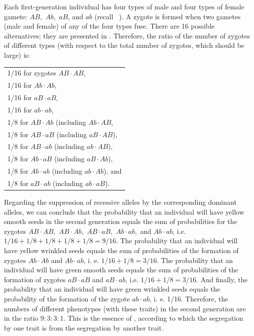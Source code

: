 Each first-generation individual has four types of male and four types
of female gamete: $AB, \,\, Ab,\,\, aB$, and $ab$ (recall ~). A zygote is formed when two gametes (male and female) of any of the four types fuse. There are 16 possible alternatives; they are presented in .  Therefore, the ratio of the number of zygotes of different types (with respect to the total number of zygotes, which should be large) is: \vspace{-15pt}
\begin{center}
\begin{tabular}{l}
1/16 for zygotes $AB \cdot AB$, \\
1/16 for $Ab \cdot Ab$, \\
1/16 for $aB \cdot aB$, \\
1/16 for $ab \cdot ab$, \\
1/8 for $AB \cdot Ab$ (including $Ab \cdot AB$, \\
1/8 for $AB \cdot aB$ (including $aB \cdot AB$),\\
1/8 for $AB \cdot ab$ (including $ab \cdot AB$), \\
1/8 for $Ab \cdot aB$ (including $aB \cdot Ab$), \\
1/8 for $Ab \cdot ab$ (including $ab \cdot Ab$), and \\
1/8 for $aB \cdot ab$ (including $ab \cdot aB$). 
\end{tabular}
\end{center}
\vspace{-15pt}

Regarding the suppression of recessive alleles by the corresponding dominant alleles,
we can conclude that the probability that an individual will have yellow
smooth seeds in the second generation equals the sum of probabilities
for the zygotes $AB\cdot AB, \,\, AB \cdot Ab,\,\, AB \cdot aB, \,\, Ab \cdot ab,$ and $Ab\cdot ab$, i.e. $1/16 +
1/8 + 1/8+ 1/8 + 1/8 = 9/16$. The probability that an individual will have
yellow wrinkled seeds equals the sum of probabilities of the formation of
zygotes $Ab \cdot  Ab$ and $Ab \cdot  ab$, i. e. $1/16 + 1/8 = 3/16.$ The probability that
an individual will have green smooth seeds equals the sum of
probabilities of the formation of zygotes $aB \cdot  aB$ and $aB \cdot  ab$, i.e. $1/16 + 1/8 = 3/16$. And finally, the probability that an individual will have
green wrinkled seeds equals the probability of the formation of the
zygote $ab \cdot  ab$, i. e. 1/16. Therefore, the numbers of different phenotypes (with these traits) in the second generation are in the ratio $9 :3 : 3 : 1$. This is the essence of , according to which the segregation by one trait is  from the segregation by another
trait.


